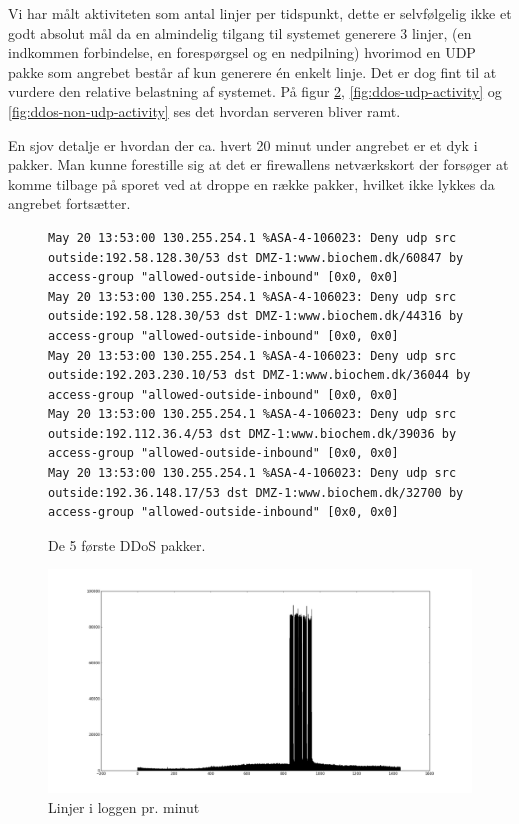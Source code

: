 \documentclass[10pt,a4paper,danish]{article}
\begin{document}
Vi har målt aktiviteten som antal linjer per tidspunkt, dette er selvfølgelig
ikke et godt absolut mål da en almindelig tilgang til systemet generere 3
linjer, (en indkommen forbindelse, en forespørgsel og en nedpilning) hvorimod en
UDP pakke som angrebet består af kun generere én enkelt linje.
Det er dog fint til at vurdere den relative belastning af systemet.
På figur \ref{fig:ddos-all-activity}, \ref{fig:ddos-udp-activity} og
\ref{fig:ddos-non-udp-activity} ses det hvordan serveren bliver ramt.

En sjov detalje er hvordan der ca. hvert 20 minut under angrebet er et dyk i
pakker.
Man kunne forestille sig at det er firewallens netværkskort der forsøger at
komme tilbage på sporet ved at droppe en række pakker, hvilket ikke lykkes da
angrebet fortsætter.

\begin{landscape}
\begin{figure}[h!]\centering
\begin{verbatim}
May 20 13:53:00 130.255.254.1 %ASA-4-106023: Deny udp src outside:192.58.128.30/53 dst DMZ-1:www.biochem.dk/60847 by access-group "allowed-outside-inbound" [0x0, 0x0]
May 20 13:53:00 130.255.254.1 %ASA-4-106023: Deny udp src outside:192.58.128.30/53 dst DMZ-1:www.biochem.dk/44316 by access-group "allowed-outside-inbound" [0x0, 0x0]
May 20 13:53:00 130.255.254.1 %ASA-4-106023: Deny udp src outside:192.203.230.10/53 dst DMZ-1:www.biochem.dk/36044 by access-group "allowed-outside-inbound" [0x0, 0x0]
May 20 13:53:00 130.255.254.1 %ASA-4-106023: Deny udp src outside:192.112.36.4/53 dst DMZ-1:www.biochem.dk/39036 by access-group "allowed-outside-inbound" [0x0, 0x0]
May 20 13:53:00 130.255.254.1 %ASA-4-106023: Deny udp src outside:192.36.148.17/53 dst DMZ-1:www.biochem.dk/32700 by access-group "allowed-outside-inbound" [0x0, 0x0]
\end{verbatim}
\caption{De 5 første DDoS pakker.}
\label{fig:ddos-pakker}
\end{figure}
\end{landscape}

\begin{figure}[h!]
  \centering
  \includegraphics[width=\textwidth]{all-activity.png}
  \caption{Linjer i loggen pr. minut}
  \label{fig:ddos-all-activity}
\end{figure}
\end{document}

